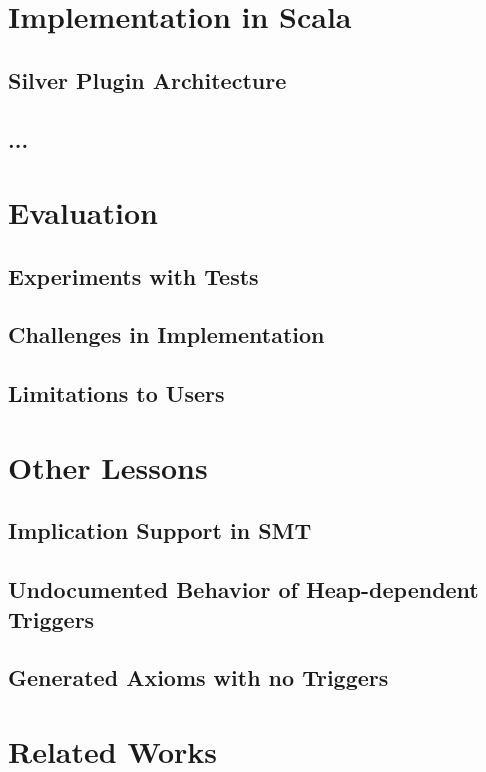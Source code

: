 \documentclass[msc,oneside]{ubcthesis}
\begin{document}
\chapter{Implementation in Scala}

\section{Silver Plugin Architecture}

\section{...}

\chapter{Evaluation}

\section{Experiments with Tests}

\section{Challenges in Implementation}

\section{Limitations to Users}

\chapter{Other Lessons}

\section{Implication Support in SMT}

\section{Undocumented Behavior of Heap-dependent Triggers}

\section{Generated Axioms with no Triggers}

\chapter{Related Works}
\end{document}

